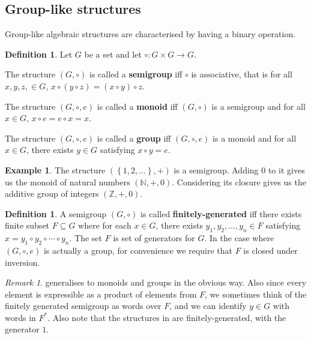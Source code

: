 \documentclass[british,a4paper,]{scrartcl}
\theoremstyle{definition}
\newtheorem{definition}[theorem]{Definition}
\newtheorem{example}[theorem]{Example}
\theoremstyle{remark}
\newtheorem*{remark}{Remark}
\newcommand{\set}[1]{\left\{ #1 \right\}}
\newcommand{\N}{\mathbb{N}}
\newcommand{\Z}{\mathbb{Z}}
\begin{document}
\subsection{Group-like structures}

Group-like algebraic structures are characterised by having a binary operation.

\begin{definition}
    Let \(G\) be a set and let \(\circ : G\times G \to G\).

    The structure \((G,\circ)\) is called a \textbf{semigroup} iff \(\circ\) is associative,
    that is for all \(x,y,z,\in G\), \(x\circ(y\circ z) = (x\circ y)\circ z\).

    The structure \((G, \circ, e)\) is called a \textbf{monoid} iff \((G, \circ)\) is a semigroup
    and for all \(x\in G\), \(x\circ e = e \circ x = x\).

    The structure \((G, \circ, e)\) is called a \textbf{group} iff \((G, \circ, e)\) is a monoid
    and for all \(x\in G\), there exists \(y \in G\) satisfying \(x\circ y = e\).
\end{definition}
\begin{example} \label{example:integers}
    The structure \((\set{1,2,\dots}, +)\) is a semigroup.
    Adding \(0\) to it gives us the monoid of natural numbers \((\N, +, 0)\).
    Considering its closure gives us the additive group of integers \((\Z, +, 0)\).
\end{example}
\begin{definition} \label{def:finitelygenerated}
    A semigroup \((G, \circ)\) is called \textbf{finitely-generated} iff
    there exists finite subset \(F \subseteq G\) where
    for each \(x \in G\), there exists \(y_1, y_2,\dots, y_n\in F\) satisfying
    \(x = y_1\circ y_2 \circ \cdots \circ y_n\).
    The set \(F\) is set of generators for \(G\).
    In the case where \((G, \circ, e)\) is actually a group,
    for convenience we require that \(F\) is closed under inversion.
\end{definition}

\begin{remark}
     generalises to monoids and groups in the obvious way.
    Also since every element is expressible as a product of elements from \(F\),
    we sometimes think of the finitely generated semigroup as words over \(F\), and we can identify \(y\in G\) with words in \(F^*\).
    Also note that the structures in  are finitely-generated,
    with the generator \(1\).
\end{remark}
\end{document}
